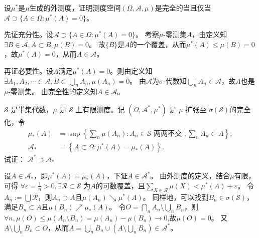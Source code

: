 \documentclass{ctexart}
\newif\ifpreface
\begin{document}
\large
\setlength{\baselineskip}{1.2em}
\ifpreface

\else
\maketitle
\fi
{}

\begin{problem}\label{pro:21}
  设\(\mu^* \)是\(\mu \)生成的外测度，证明测度空间\((\Omega,\mathcal{A},\mu)\)是完全的当且仅当\(\mathcal{A} \supset \{A \in \Omega:\mu^*(A)=0\} \)。
\end{problem}
\begin{solution}
  先证充分性。设\(\mathcal{A} \supset \{A \in \Omega:\mu^*(A)=0\}\)。
  考察\(\mu \)-零测集\(A \)，由定义知\(\exists B \in \mathcal{A},A \subset B,\mu(B)=0 \)。
  故\(\{B\} \)是\(A \)的一个覆盖，从而\(\mu^*(A) \leq \mu(B)=0 \)，故\(\mu^*(A)=0 \)，从而\(A \in \mathcal{A} \)。

  再证必要性。设\(A \)满足\(\mu^*(A)=0 \)。则由定义知\(\exists A_1,A_2,\cdots \in \mathcal{A},B \subset \bigcup_{n}A_n,\mu(A_n)=0 \)。
  由\(\mathcal{A} \)为\(\sigma \)-代数知\(\bigcup_{n}A_n \in \mathcal{A} \)，故\(A \)也是\(\mu \)-零测集。
  由完全性的定义知\(A \in \mathcal{A} \)。
\end{solution}

\begin{problem}\label{pro:22}
  $\mathscr{S}$ 是半集代数，$\mu$ 是 $\mathscr{S}$ 上有限测度。记 $\left(\Omega, \mathscr{A}^*, \mu^*\right)$ 是 $\mu$ 扩张至 $\sigma(\mathscr{S})$的完全化，令
  $$
  \begin{aligned}
    \mu_*(A) & =\sup \left\{\sum_n \mu\left(A_n\right): A_n \in \mathscr{S} \text { 两两不交 },\sum_n A_n \subset A\right\}, \\
    \mathscr{A}_* & =\left\{A \subset \Omega: \mu^*(A)=\mu_*(A)\right\} .
  \end{aligned}
  $$
  试证： \(\mathscr{A}^* \supset \mathscr{A}_*\)
\end{problem}
\begin{solution}
  设\(A \in \mathcal{A}_{*} \)，即\(\mu^{*}(A)=\mu_{*}(A) \)，下证\(A \in \mathcal{A}^* \)。
  由外测度的定义，结合\(\mu \)有限，可得 \(\forall \varepsilon =\frac{1}{n} >0,\exists \mathcal{R} \subset \mathscr{S} \)  为\(A \)的可数覆盖，且\(\sum_{X \in \mathcal{R}}\mu(X) < \mu^*(A) + \varepsilon \)。
  令\(A_n := \bigcup \mathcal{R} \)，则\(A_n \supset A \)且\(\mu(A_n)\searrow \mu^*(A) \)。
  同样地，可以找到\(B_n \in \sigma(\mathscr{S}) \)，满足\(B_n \subset A \)且\(\mu(B_n) \nearrow \mu_*(A) \)。
  令\(O=\bigcap_{n}A_n \setminus \bigcup_{n} B_n \)，则\(\forall n, \mu(O) \leq \mu(A_n \setminus B_n)=\mu(A_n)-\mu(B_n) \to 0 \),故\(\mu(O)=0 \)。
  又\(A \setminus \bigcup_{n}B_n \subset O\)，从而\(A=\bigcup_{n}B_n \cup (A \setminus \bigcup_{n}B_n) \in \mathcal{A}^* \)。
\end{solution}
\end{document}
